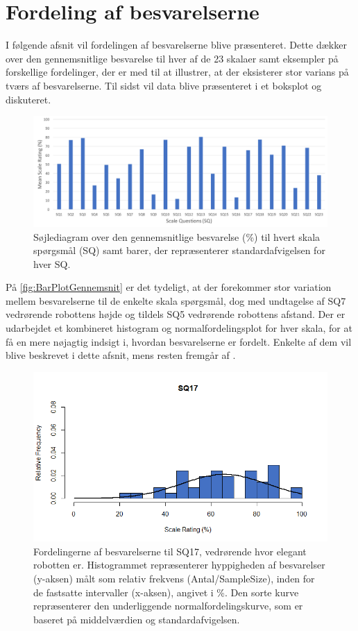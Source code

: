 \section{Fordeling af besvarelserne}
\label{TestAfSkalaFordeling}
%
I følgende afsnit vil fordelingen af besvarelserne blive præsenteret. Dette dækker over den gennemsnitlige besvarelse til hver af de 23 skalaer samt eksempler på forskellige fordelinger, der er med til at illustrer, at der eksisterer stor varians på tværs af besvarelserne. Til sidst vil data blive præsenteret i et boksplot og diskuteret.
%
\begin{figure}[H]
\centering
\includegraphics[width = \textwidth]{Figure/DatabehandlingSkalaer/DataPresentation/MeanBarplot} 
 \caption{Søjlediagram over den gennemsnitlige besvarelse (\%) til hvert skala spørgsmål (SQ) samt barer, der repræsenterer standardafvigelsen for hver SQ.}
\label{fig:BarPlotGennemsnit}
\end{figure}
\noindent
%
På \autoref{fig:BarPlotGennemsnit} er det tydeligt, at der forekommer stor variation mellem besvarelserne til de enkelte skala spørgsmål, dog med undtagelse af SQ7 vedrørende robottens højde og tildels SQ5 vedrørende robottens afstand. \blankline
%
Der er udarbejdet et kombineret histogram og normalfordelingsplot for hver skala, for at få en mere nøjagtig indsigt i, hvordan besvarelserne er fordelt. Enkelte af dem vil blive beskrevet i dette afsnit, mens resten fremgår af .
%
\begin{figure}[H]
\centering
\includegraphics[width = \textwidth]{Figure/DatabehandlingSkalaer/HistogramNormalFordeling/SQ17} 
\caption{Fordelingerne af besvarelserne til SQ17, vedrørende hvor elegant robotten er. Histogrammet repræsenterer hyppigheden af besvarelser (y-aksen) målt som relativ frekvens (Antal/SampleSize), inden for de fastsatte intervaller (x-aksen), angivet i \%. Den sorte kurve repræsenterer den underliggende normalfordelingskurve, som er baseret på middelværdien og standardafvigelsen.}
\label{fig:Histogram17}
\end{figure}

